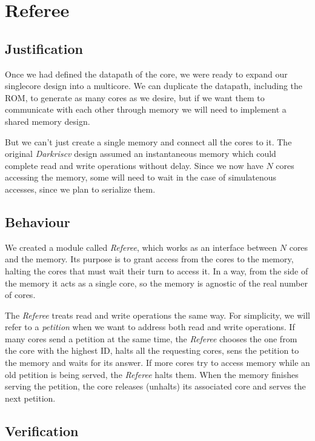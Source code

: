 \section{Referee}

\subsection{Justification} \label{referee-justification}
Once we had defined the datapath of the core, we were ready to expand our singlecore design into a multicore.
We can duplicate the datapath, including the ROM, to generate as many cores as we desire, but if we want them to communicate with each other through memory we will need to implement a shared memory design.

But we can't just create a single memory and connect all the cores to it.
The original \textit{Darkriscv} design assumed an instantaneous memory which could complete read and write operations without delay.
Since we now have $N$ cores accessing the memory, some will need to wait in the case of simulatenous accesses, since we plan to serialize them.


\subsection{Behaviour} \label{referee-behaviour}
We created a module called \textit{Referee}, which works as an interface between $N$ cores and the memory.
Its purpose is to grant access from the cores to the memory, halting the cores that must wait their turn to access it.
In a way, from the side of the memory it acts as a single core, so the memory is agnostic of the real number of cores.


The \textit{Referee} treats read and write operations the same way. 
For simplicity, we will refer to a \textit{petition} when we want to address both read and write operations.
If many cores send a petition at the same time, the \textit{Referee} chooses the one from the core with the highest ID, halts all the requesting cores, sens the petition to the memory and waits for its answer. 
If more cores try to access memory while an old petition is being served, the \textit{Referee} halts them.
When the memory finishes serving the petition, the core releases (unhalts) its associated core and serves the next petition.

\subsection{Verification}

